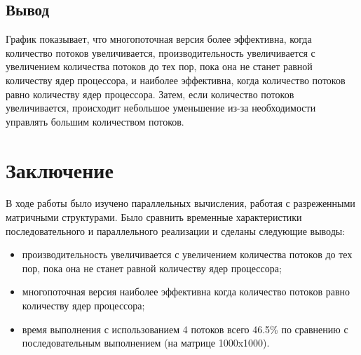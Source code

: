 
\section{Вывод}

График показывает, что многопоточная версия более эффективна,
когда количество потоков увеличивается, производительность увеличивается с увеличением количества потоков до тех пор,
пока она не станет равной количеству ядер процессора, и наиболее эффективна,
когда количество потоков равно количеству ядер процессора.
Затем, если количество потоков увеличивается, происходит небольшое уменьшение
из-за необходимости управлять большим количеством потоков.



\chapter*{Заключение}

В ходе работы было изучено параллельных вычисления,
работая с разреженными матричными структурами.
Было сравнить временные характеристики последовательного и параллельного реализации
и сделаны следующие выводы:

\begin{itemize}
    \item производительность увеличивается с увеличением количества потоков до тех пор,
    пока она не станет равной количеству ядер процессора;
    \item многопоточная версия наиболее эффективна когда количество потоков равно количеству ядер процессора;
    \item время выполнения с использованием 4 потоков всего 46.5\% по сравнению с последовательным выполнением (на матрице 1000x1000).
\end{itemize}
